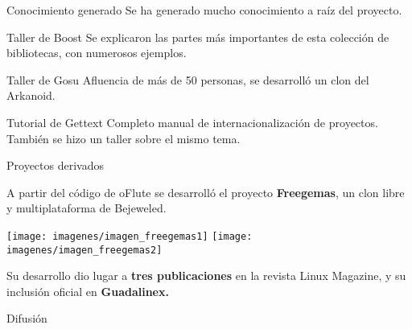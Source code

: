 \begin{frame}{Conocimiento generado}
  Se ha generado mucho conocimiento a raíz del proyecto. 

  \pause

  \begin{block}{Taller de Boost}
    Se explicaron las partes más importantes de esta colección de bibliotecas,
    con numerosos ejemplos.
  \end{block}

  \pause

  \begin{block}{Taller de Gosu}
    Afluencia de más de 50 personas, se desarrolló un clon del Arkanoid.
  \end{block}

  \pause

  \begin{block}{Tutorial de Gettext}
    Completo manual de internacionalización de proyectos. También se hizo un
    taller sobre el mismo tema.
  \end{block}
\end{frame}

\begin{frame}{Proyectos derivados}

  \begin{center}
    A partir del código de oFlute se desarrolló el proyecto \textbf{Freegemas}, un clon
    libre y multiplataforma de Bejeweled.

    \medskip

    \texttt{[image: imagenes/imagen\_freegemas1]}\hspace{0.1cm}
    \texttt{[image: imagenes/imagen\_freegemas2]}

    \medskip

    Su desarrollo dio lugar a \textbf{tres publicaciones} en la revista Linux
    Magazine, y su inclusión oficial en \textbf{Guadalinex.}
  \end{center}

\end{frame}

\begin{frame}{Difusión}
  
\end{frame}
